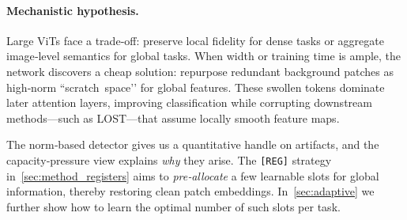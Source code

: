 \documentclass{article}
\newcommand{\RegTok}{\texttt{[REG]}\xspace}
\newcommand{\citep}{\parencite}
\begin{document}
\begin{table}[t]
  \centering
  \caption{Single‑token linear probes with ViT‑g features~\citep{darcetVisionTransformersNeed2024}.  
           Artifacts outperform normal patches and approach \texttt{[CLS]} on global tasks.}
  \label{tab:logreg_weird_patches_image_classif}
  \vspace{0.2em}
  \vspace{-1em}
\end{table}

\paragraph{Mechanistic hypothesis.}
Large ViTs face a trade‑off: preserve local fidelity for dense tasks or aggregate image‑level semantics for global tasks.
When width or training time is ample, the network discovers a cheap solution: repurpose redundant background patches as high‑norm ``scratch space’’ for global features.
These swollen tokens dominate later attention layers, improving classification while corrupting downstream methods—such as LOST—that assume locally smooth feature maps.

The norm‑based detector gives us a quantitative handle on artifacts, and the capacity‑pressure view explains \emph{why} they arise.
The \RegTok strategy in \cref{sec:method_registers} aims to \emph{pre‑allocate} a few learnable slots for global information, thereby restoring clean patch embeddings.
In \cref{sec:adaptive} we further show how to learn the optimal number of such slots per task.
\end{document}

